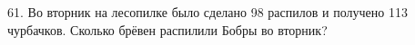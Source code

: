 61. Во вторник на лесопилке было сделано 98 распилов и получено 113 чурбачков. Сколько брёвен распилили Бобры во вторник?\\
